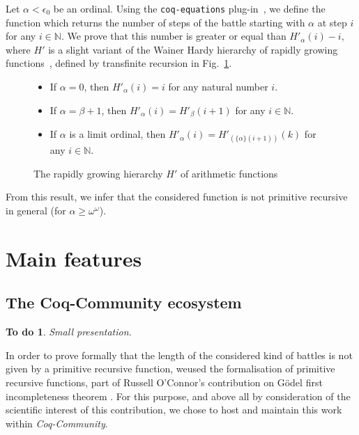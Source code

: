 \documentclass{easychair}
\makeatletter
\newcommand{\inputsnippets}[1]
  {{\setlength{\itemsep}{1pt}\setlength{\parsep}{0pt}%
    \alectryon@copymacros\begin{io}
      \forcsvlist{\item\@inputsnippet}{#1}
    \end{io}}}
\let@old Save definition of 
\newcommand{\@inputsnippet}[1]
  {{\renewenvironment{alectryon}{}{}%
    @old{../movies/snippets/#1}}}
\newcommand{\canonseq}[2]{\mbox{$\{#1\}(#2)$}}
\newtheorem{todo}{To do}
\makeatother
\begin{document}
 



Let $\alpha<\epsilon_0$ be an ordinal.
Using the \texttt{coq-equations} plug-in~\cite{sozeau:hal-01671777}, we define the function which returns the number of steps of the battle starting with $\alpha$ at step $i$ for  any $i\in\mathbb{N}$.
We prove that this number is greater or equal than
$H'_\alpha(i)-i$, where $H'$ is a slight variant of the Wainer Hardy hierarchy of rapidly growing functions~\cite{BW85, KS81, Promel2013, Wainer1970}, defined by transfinite recursion in Fig.~\ref{fig:Hprime}.


\begin{figure}[h]
  \centering
  \begin{itemize}
\item If $\alpha=0$, then $H'_\alpha (i)= i$ for any natural number $i$.
\item If $\alpha=\beta+1$, then 
$H'_\alpha(i)=H'_\beta(i+1)$ for any $i \in \mathbb{N}$.
\item If $\alpha$ is a limit ordinal, then 
$H'_\alpha(i) = H'_{(\canonseq{\alpha}{i+1})}(k)$ for any $i\in \mathbb{N}$.
\end{itemize}
\vspace{4pt}
\inputsnippets{Hprime/HprimeDef}
\caption{The rapidly growing hierarchy $H'$ of arithmetic functions}
\label{fig:Hprime}
\end{figure}

\label{sect:not-pr}
From this result, we infer that the considered function is not primitive recursive in general (for $\alpha\geq\omega^\omega$).


 
\section{Main features}




\subsection{The Coq-Community ecosystem}
\begin{todo}
Small presentation.
\end{todo}

In order to prove formally that the length of the considered
kind of battles is not given by a primitive recursive function, weused the formalisation of primitive recursive functions, part
of Russell O'Connor's contribution on G\"{o}del first incompleteness theorem \cite{OConnor05, Goedel}.
For this purpose, and above all by consideration of the scientific interest of this contribution, we chose to host and maintain this work within \textit{Coq-Community}.
\end{document}

